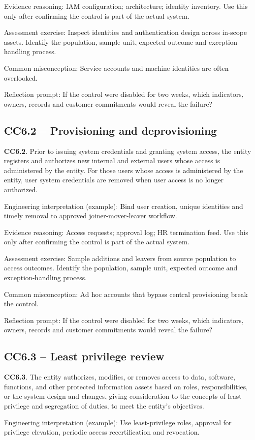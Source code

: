 \documentclass[10pt,oneside]{report}
\begin{document}
Evidence reasoning: IAM configuration; architecture; identity inventory. Use this only after confirming the control is part of the actual system.

Assessment exercise: Inspect identities and authentication design across in-scope assets. Identify the population, sample unit, expected outcome and exception-handling process.

Common misconception: Service accounts and machine identities are often overlooked.

Reflection prompt: If the control were disabled for two weeks, which indicators, owners, records and customer commitments would reveal the failure?

\subsection{CC6.2 -- Provisioning and deprovisioning}
\begin{aicpabox}
\textbf{CC6.2}. Prior to issuing system credentials and granting system access, the entity registers and authorizes new internal and external users whose access is administered by the entity. For those users whose access is administered by the entity, user system credentials are removed when user access is no longer authorized.\par{}
\end{aicpabox}
Engineering interpretation (example): Bind user creation, unique identities and timely removal to approved joiner-mover-leaver workflow.

Evidence reasoning: Access requests; approval log; HR termination feed. Use this only after confirming the control is part of the actual system.

Assessment exercise: Sample additions and leavers from source population to access outcomes. Identify the population, sample unit, expected outcome and exception-handling process.

Common misconception: Ad hoc accounts that bypass central provisioning break the control.

Reflection prompt: If the control were disabled for two weeks, which indicators, owners, records and customer commitments would reveal the failure?

\subsection{CC6.3 -- Least privilege review}
\begin{aicpabox}
\textbf{CC6.3}. The entity authorizes, modifies, or removes access to data, software, functions, and other protected information assets based on roles, responsibilities, or the system design and changes, giving consideration to the concepts of least privilege and segregation of duties, to meet the entity's objectives.\par{}
\end{aicpabox}
Engineering interpretation (example): Use least-privilege roles, approval for privilege elevation, periodic access recertification and revocation.
\end{document}
